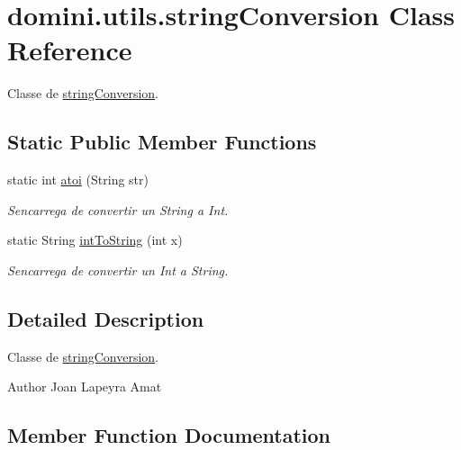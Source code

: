 \hypertarget{classdomini_1_1utils_1_1stringConversion}{}\section{domini.\+utils.\+string\+Conversion Class Reference}
\label{classdomini_1_1utils_1_1stringConversion}


Classe de \hyperlink{classdomini_1_1utils_1_1stringConversion}{string\+Conversion}.  


\subsection*{Static Public Member Functions}
\begin{DoxyCompactItemize}
\item 
static int \hyperlink{classdomini_1_1utils_1_1stringConversion_ac5d58fb65893c40fc46af0fae55772ca}{atoi} (String str)
\begin{DoxyCompactList}\small\item\em S\textquotesingle{}encarrega de convertir un String a Int. \end{DoxyCompactList}\item 
static String \hyperlink{classdomini_1_1utils_1_1stringConversion_ab10fa673e68698a6a0f29971a60fe274}{int\+To\+String} (int x)
\begin{DoxyCompactList}\small\item\em S\textquotesingle{}encarrega de convertir un Int a String. \end{DoxyCompactList}\end{DoxyCompactItemize}


\subsection{Detailed Description}
Classe de \hyperlink{classdomini_1_1utils_1_1stringConversion}{string\+Conversion}. 

\begin{DoxyAuthor}{Author}
Joan Lapeyra Amat 
\end{DoxyAuthor}


\subsection{Member Function Documentation}
\mbox{\label{classdomini_1_1utils_1_1stringConversion_ac5d58fb65893c40fc46af0fae55772ca}} 
